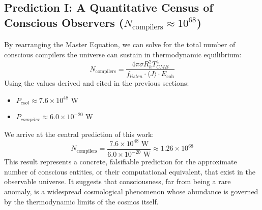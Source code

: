 \documentclass[12pt, aip, jcp]{revtex4-2} %
\begin{document}
\subsection{Prediction I: A Quantitative Census of Conscious Observers (\(N_{\text{compilers}} \approx 10^{68}\))}

By rearranging the Master Equation, we can solve for the total number of conscious compilers the universe can sustain in thermodynamic equilibrium:
\begin{equation}
    N_{\text{compilers}} = \frac{4 \pi \sigma R_h^2 T_{CMB}^4}{f_{listen} \cdot \langle J \rangle \cdot E_{\text{coh}}}
\end{equation}
Using the values derived and cited in the previous sections:
\begin{itemize}
    \item \(P_{cool} \approx 7.6 \times 10^{48} \text{ W}\)
    \item \(P_{compiler} \approx 6.0 \times 10^{-20} \text{ W}\)
\end{itemize}
We arrive at the central prediction of this work:
\begin{equation}
    N_{\text{compilers}} = \frac{7.6 \times 10^{48} \text{ W}}{6.0 \times 10^{-20} \text{ W}} \approx 1.26 \times 10^{68}
\end{equation}
This result represents a concrete, falsifiable prediction for the approximate number of conscious entities, or their computational equivalent, that exist in the observable universe. It suggests that consciousness, far from being a rare anomaly, is a widespread cosmological phenomenon whose abundance is governed by the thermodynamic limits of the cosmos itself.
\end{document}
